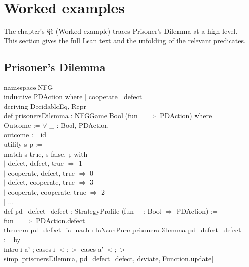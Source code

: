 \documentclass[11pt]{article}
\begin{document}
\section{Worked examples}
\label{sec:supp:examples}

The chapter's §6 (Worked example) traces Prisoner's Dilemma at a
high level.  This section gives the full Lean text and the
unfolding of the relevant predicates.

\subsection{Prisoner's Dilemma}
\label{sec:supp:examples:pd}

\begin{leanbox}
namespace NFG\\[1pt]
inductive PDAction where $\mid$ cooperate $\mid$ defect\\
deriving DecidableEq, Repr\\[3pt]
def prisonersDilemma : NFGGame Bool (fun \_ $\Rightarrow$ PDAction) where\\
\bd Outcome := $\forall$ \_ : Bool, PDAction\\
\bd outcome := id\\
\bd utility s p :=\\
\bdd match s true, s false, p with\\
\bdd $\mid$ defect, defect, true $\Rightarrow$ 1\\
\bdd $\mid$ cooperate, defect, true $\Rightarrow$ 0\\
\bdd $\mid$ defect, cooperate, true $\Rightarrow$ 3\\
\bdd $\mid$ cooperate, cooperate, true $\Rightarrow$ 2\\
\bdd $\mid$ $\ldots$\\[3pt]
def pd\_defect\_defect : StrategyProfile (fun \_ : Bool $\Rightarrow$ PDAction) :=\\
\bd fun \_ $\Rightarrow$ PDAction.defect\\[3pt]
theorem pd\_defect\_is\_nash : IsNashPure prisonersDilemma pd\_defect\_defect := by\\
\bd intro i a' ; cases i $<;>$ cases a' $<;>$\\
\bdd simp [prisonersDilemma, pd\_defect\_defect, deviate, Function.update]
\end{leanbox}
\end{document}
